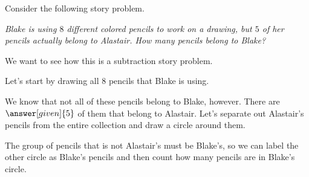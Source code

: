 \documentclass{ximera}
\begin{document}
\begin{example}
Consider the following story problem. 

\emph{Blake is using $8$ different colored pencils to work on a drawing, but $5$ of her pencils actually belong to Alastair. How many pencils belong to Blake?}

We want to see how this is a subtraction story problem.

Let's start by drawing all $8$ pencils that Blake is using.

\begin{image}
\end{image}

We know that not all of these pencils belong to Blake, however. There are $\answer[given]{5}$ of them that belong to Alastair. Let's separate out Alastair's pencils from the entire collection and draw a circle around them.

\begin{image}
 \end{image}

The group of pencils that is not Alastair's must be Blake's, so we can label the other circle as Blake's pencils and then count how many pencils are in Blake's circle.



\end{example}
\end{document}
